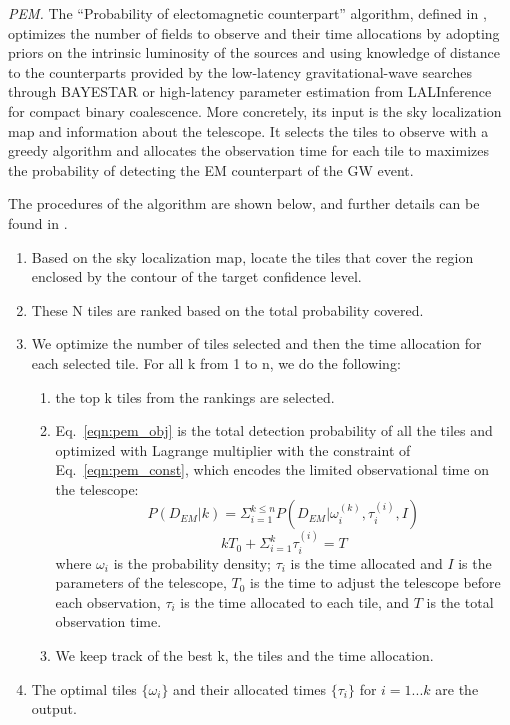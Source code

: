 \documentclass[twocolumn]{aastex62}
\begin{document}
\emph{PEM.} The ``Probability of electomagnetic counterpart'' algorithm, defined in \cite{ChHu2017}, optimizes the number of fields to observe and their time allocations by adopting priors on the intrinsic luminosity of the sources and using knowledge of distance to the counterparts provided by the low-latency gravitational-wave searches through BAYESTAR \citep{SiPr2016} or high-latency parameter estimation from LALInference \citep{VeRa2015} for compact binary coalescence. More concretely, its input is the sky localization map and information about the telescope. It selects the tiles to observe with a greedy algorithm and allocates the observation time for each tile to maximizes the probability of detecting the EM counterpart of the GW event. 

The procedures of the algorithm are shown below, and further details can be found in \cite{ChHu2017}.
\begin{enumerate}
\item Based on the sky localization map, locate the tiles that cover the region enclosed by the contour of the target confidence level.
\item These N tiles are ranked based on the total probability covered.
\item We optimize the number of tiles selected and then the time allocation for each selected tile. For all k from 1 to n, we do the following:
\begin{enumerate}
\item the top k tiles from the rankings are selected. 

\item Eq.~\ref{eqn:pem_obj} is the total detection probability of all the tiles and optimized with Lagrange multiplier with the constraint of Eq.~\ref{eqn:pem_const}, which encodes the limited observational time on the telescope: 
\begin{equation}\label{eqn:pem_obj}
P(D_{EM}|k)=\Sigma_{i=1}^{k\leq n}P(D_{EM}|\omega_i^{(k)}, \tau_i^{(i)},I)
\end{equation}
\begin{equation}\label{eqn:pem_const}
kT_0+\Sigma_{i=1}^k\tau_i^{(i)}=T
\end{equation}
where $\omega_i$ is the probability density; $\tau_i$ is the time allocated and $I$ is the parameters of the telescope, $T_0$ is the time to adjust the telescope before each observation, $\tau_i$ is the time allocated to each tile, and $T$ is the total observation time.
\item We keep track of the best k, the tiles and the time allocation.
\end{enumerate}

\item The optimal tiles $\{\omega_i\}$ and their allocated times $\{\tau_i\}$ for $i=1...k$ are the output.
\end{enumerate}
\end{document}
